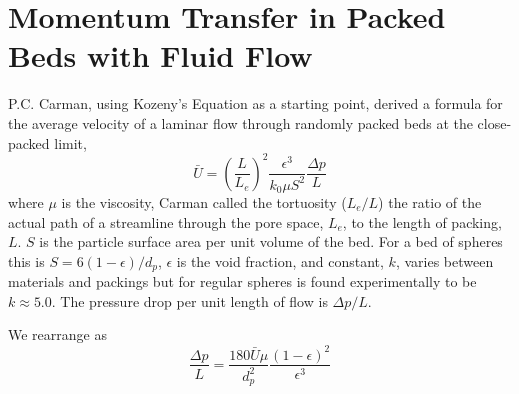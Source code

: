 \section{Momentum Transfer in Packed Beds with Fluid Flow} \label{sec:modeling-pressure-drop}








P.C. Carman\cite{Carman1997}, using Kozeny's Equation as a starting point, derived a formula for the average velocity of a laminar flow through randomly packed beds at the close-packed limit,
\begin{equation}\label{eq:K-C-velocity}
    \bar{U} = \left(\frac{L}{L_e}\right)^2\frac{\epsilon^3}{k_0\mu S^2}\frac{\Delta p}{L}
\end{equation}
where $\mu$ is the viscosity, Carman called the tortuosity ($L_e/L$) the ratio of the actual path of a streamline through the pore space, $L_e$, to the length of packing, $L$. $S$ is the particle surface area per unit volume of the bed. For a bed of spheres this is $S = 6(1-\epsilon)/d_p$, $\epsilon$ is the void fraction, and constant, $k$, varies between materials and packings but for regular spheres is found experimentally to be $k\approx 5.0$. The pressure drop per unit length of flow is $\Delta p/L$.

We rearrange  as
\begin{equation}\label{eq:K-C-pressure}
    \frac{\Delta p}{L} = \frac{180 \bar{U} \mu}{d_p^2} \frac{(1-\epsilon)^2}{\epsilon^3}
\end{equation}

